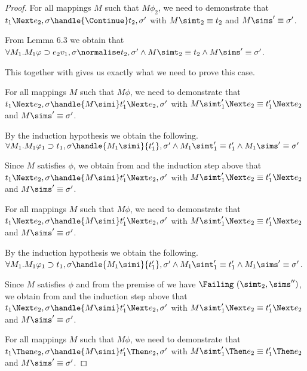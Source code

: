 \begin{proof}
{  For all mappings $M$ such that $M\phi_2$, we need to demonstrate that
  $t_1\Next e_2,\sigma\handle{\Continue}t_2,\sigma'$ with
  $M \simt_2 \equiv {t_2}$ and $M\sims'\equiv{\sigma'}$.

  From Lemma 6.3 we obtain that $\forall M_1. M_1 \phi \implies e_2 v_1,\sigma{\normalise}{t_2},{\sigma'}\land M \simt_2\equiv{t_2}\land M \sims'\equiv{\sigma'}$.

  This together with  gives us exactly what we need to prove this case.
    }

  {
  For all mappings $M$ such that $M\phi$, we need to demonstrate that
  $t_1\Next e_2,\sigma\handle{M\simi}t_1'\Next e_2,\sigma'$ with
  $M \simt_1' \Next e_2 \equiv {t_1'}\Next e_2$ and $M\sims'\equiv{\sigma'}$.

  By the induction hypothesis we obtain the following.
  $\forall M_1 . M_1 \phi_1 \implies t_1,\sigma \handle{M_1 \simi} {t_1'},{\sigma'}\land M_1 \simt_1'\equiv{t_1'}\land M_1\sims' \equiv {\sigma'}$

  Since $M$ satisfies $\phi$, we obtain from  and the induction step above that $t_1\Next e_2,\sigma\handle{M\simi}t_1'\Next e_2,\sigma'$ with
  $M \simt_1' \Next e_2 \equiv {t_1'}\Next e_2$ and $M\sims'\equiv{\sigma'}$.
  }

    {
    For all mappings $M$ such that $M\phi$, we need to demonstrate that
    $t_1\Next e_2,\sigma\handle{M\simi}t_1'\Next e_2,\sigma'$ with
    $M \simt_1' \Next e_2 \equiv {t_1'}\Next e_2$ and $M\sims'\equiv{\sigma'}$.

    By the induction hypothesis we obtain the following.
    $\forall M_1 . M_1 \phi_1 \implies t_1,\sigma \handle{M_1 \simi} {t_1'},{\sigma'}\land M_1 \simt_1'\equiv{t_1'}\land M_1\sims' \equiv {\sigma'}$.

    Since $M$ satisfies $\phi$ and from the premise of  we have $\Failing\ (\simt_2,\sims'')$, we obtain from  and the induction step above that $t_1\Next e_2,\sigma\handle{M\simi}t_1'\Next e_2,\sigma'$ with
    $M \simt_1' \Next e_2 \equiv {t_1'}\Next e_2$ and $M\sims'\equiv{\sigma'}$.
    }

  {For all mappings $M$ such that $M\phi$, we need to demonstrate that
  $t_1\Then e_2,\sigma\handle{M\simi}t_1'\Then e_2,\sigma'$ with
  $M \simt_1'\Then e_2\equiv {t_1'}\Then e_2$ and $M\sims'\equiv{\sigma'}$.

}
\end{proof}
